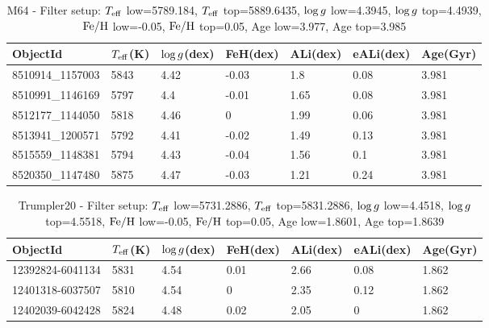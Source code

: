 \documentclass[fleqn,usenatbib]{mnras}
\begin{document}
\begin{table}
	\centering
	\begin{tabular}{l l l l l l l} 
		\hline
            ObjectId & $T_{\mathrm{eff}}$(K) & $\mathrm{log} \, g$(dex) & FeH(dex) & ALi(dex) & eALi(dex) & Age(Gyr)\\
		\hline
            8510914\_1157003 & 5843 & 4.42 & -0.03 & 1.8 & 0.08 & 3.981\\ 
            8510991\_1146169 & 5797 & 4.4 & -0.01 & 1.65 & 0.08 & 3.981\\ 
            8512177\_1144050 & 5818 & 4.46 & 0 & 1.99 & 0.06 & 3.981\\ 
            8513941\_1200571 & 5792 & 4.41 & -0.02 & 1.49 & 0.13 & 3.981\\ 
            8515559\_1148381 & 5794 & 4.43 & -0.04 & 1.56 & 0.1 & 3.981\\ 
            8520350\_1147480 & 5875 & 4.47 & -0.03 & 1.21 & 0.24 & 3.981\\ 
            \hline
	\end{tabular}
 	\caption{M64 - Filter setup: $T_{\mathrm{eff}}$ low=5789.184, $T_{\mathrm{eff}}$ top=5889.6435, $\mathrm{log} \, g$ low=4.3945, $\mathrm{log} \, g$ top=4.4939, $\mathrm{Fe}/\mathrm{H}$ low=-0.05, $\mathrm{Fe}/\mathrm{H}$ top=0.05, Age low=3.977, Age top=3.985}
	\label{tab:oc_m64}
\end{table}

\begin{table}
	\centering
	\begin{tabular}{l l l l l l l} 
		\hline
            ObjectId & $T_{\mathrm{eff}}$(K) & $\mathrm{log} \, g$(dex) & FeH(dex) & ALi(dex) & eALi(dex) & Age(Gyr)\\
		\hline
            12392824-6041134 & 5831 & 4.54 & 0.01 & 2.66 & 0.08 & 1.862\\ 
            12401318-6037507 & 5810 & 4.54 & 0 & 2.35 & 0.12 & 1.862\\ 
            12402039-6042428 & 5824 & 4.48 & 0.02 & 2.05 & 0 & 1.862\\ 
            \hline
	\end{tabular}
 	\caption{Trumpler20 - Filter setup: $T_{\mathrm{eff}}$ low=5731.2886, $T_{\mathrm{eff}}$ top=5831.2886, $\mathrm{log} \, g$ low=4.4518, $\mathrm{log} \, g$ top=4.5518, $\mathrm{Fe}/\mathrm{H}$ low=-0.05, $\mathrm{Fe}/\mathrm{H}$ top=0.05, Age low=1.8601, Age top=1.8639}
	\label{tab:oc_trumpler20}

\end{table}
\end{document}
